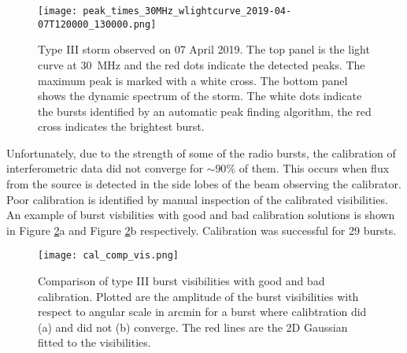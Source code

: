\begin{figure}[ht]
\centering
\texttt{[image: peak\_times\_30MHz\_wlightcurve\_2019-04-07T120000\_130000.png]}
\caption[Type III storm observed on 07 April 2019.]{Type III storm observed on 07 April 2019. The top panel is the light curve at 30~MHz and the red dots indicate the detected peaks. The maximum peak is marked with a white cross. The bottom panel shows the dynamic spectrum of the storm. The white dots indicate the bursts identified by an automatic peak finding algorithm, the red cross indicates the brightest burst.}
\label{fig:dynamic_spectrum_070419}
\end{figure}

Unfortunately, due to the strength of some of the radio bursts, the calibration of interferometric data did not converge for $\sim 90 \%$ of them. This occurs when flux from the source is detected in the side lobes of the beam observing the calibrator. Poor calibration is identified by manual inspection of the calibrated visibilities. An example of burst visbilities with good and bad calibration solutions is shown in Figure \ref{fig:cal_comp}a and Figure \ref{fig:cal_comp}b respectively. Calibration was successful for 29 bursts.  

\begin{figure}[ht]
\centering
\texttt{[image: cal\_comp\_vis.png]}
\caption[Comparison of type III burst visibilities with good and bad calibration.]{Comparison of type III burst visibilities with good and bad calibration. Plotted are the amplitude of the burst visibilities with respect to angular scale in arcmin for a burst where calibtration did (a) and did not (b) converge. The red lines are the 2D Gaussian fitted to the visibilities.}
\label{fig:cal_comp}
\end{figure}


